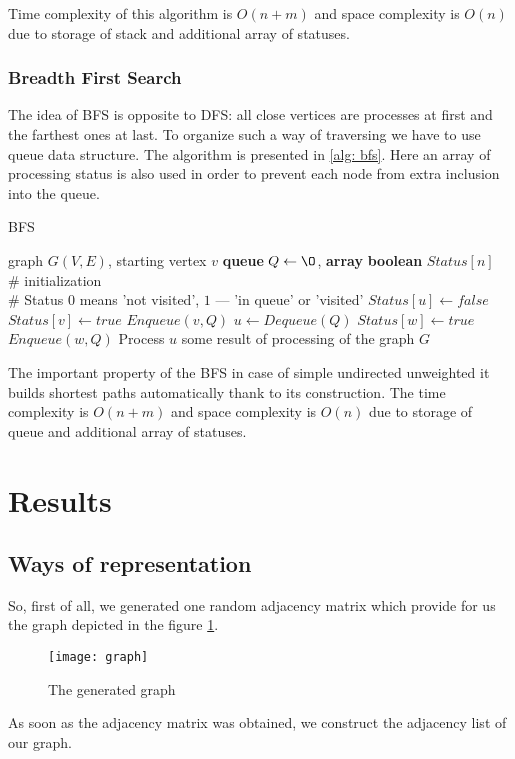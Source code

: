 \documentclass[12pt, bachelor, substylefile = algo_title.rtx]{disser}
\theoremstyle{definition}
\begin{document}
Time complexity of this algorithm is $O(n+m)$ and space complexity is $O(n)$ due to storage of stack and additional array of statuses.

\subsubsection{Breadth First Search}
The idea of BFS is opposite to DFS: all close vertices are processes at first and the farthest ones at last. To organize such a way of traversing we have to use queue data structure. The algorithm is presented in \ref{alg: bfs}. Here an array of processing status is also used in order to prevent each node from extra inclusion into the queue. 
\begin{algorithm}[!h]
\caption{BFS}
\label{alg: bfs}
\begin{algorithmic}

\Require graph $G(V, E)$, starting vertex $v$
\State \textbf{queue} $Q \gets \O$, \textbf{array} \textbf{boolean} $Status[n]$\\
\# initialization\\
\# Status $0$ means 'not visited', $1$ --- 'in queue' or 'visited'
	\State $Status[u] \gets false$
\EndFor
\State $Status[v] \gets true$
\State $Enqueue(v, Q)$
	\State $u \gets Dequeue(Q)$
				\State $Status[w] \gets true$
				\State $Enqueue(w, Q)$
			\EndIf
		\EndFor
	\State Process $u$
\EndWhile
\Ensure some result of processing of the graph $G$
\end{algorithmic}
\end{algorithm}

The important property of the BFS in case of simple undirected unweighted it builds shortest paths automatically thank to its construction. The time complexity is $O(n+m)$ and space complexity is $O(n)$ due to storage of queue and additional array of statuses.

\section{Results}
\subsection{Ways of representation}
So, first of all, we generated one random adjacency matrix which provide for us the graph depicted in the figure \ref{fig: 1}.
\begin{figure}[!h]
\begin{center}
\texttt{[image: graph]}
\caption{The generated graph}
\label{fig: 1}
\end{center}
\end{figure}
As soon as the adjacency matrix was obtained, we construct the adjacency list of our graph. 
\end{document}
